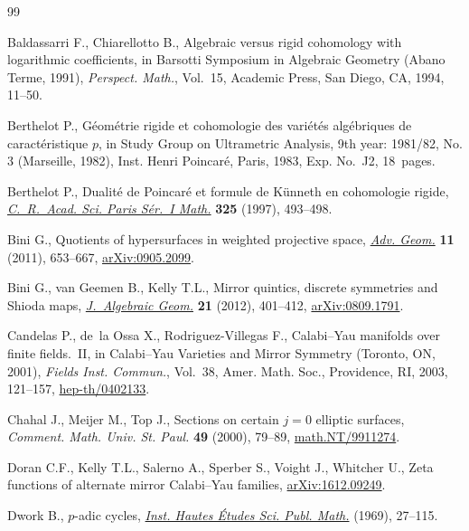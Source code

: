 \documentclass[pdftex]{sigma}
\numberwithin{equation}{section}
\begin{document}
\begin{thebibliography}{99}
\footnotesize\itemsep=0pt

Baldassarri F., Chiarellotto B., Algebraic versus rigid cohomology with
 logarithmic coef\/f\/icients, in Barsotti {S}ymposium in {A}lgebraic {G}eometry
 ({A}bano {T}erme, 1991), \textit{Perspect. Math.}, Vol.~15, Academic Press,
 San Diego, CA, 1994, 11--50.

Berthelot P., G\'eom\'etrie rigide et cohomologie des vari\'et\'es
 alg\'ebriques de caract\'eristique {$p$}, in Study Group on Ultrametric
 Analysis, 9th year: 1981/82, {N}o. 3 ({M}arseille, 1982), Inst. Henri
 Poincar\'e, Paris, 1983, Exp. No.~J2, 18~pages.

Berthelot P., Dualit\'e de {P}oincar\'e et formule de {K}\"unneth en
 cohomologie rigide, \href{https://doi.org/10.1016/S0764-4442(97)88895-7}{\textit{C.~R.~Acad. Sci. Paris S\'er.~I Math.}}
 \textbf{325} (1997), 493--498.

Bini G., Quotients of hypersurfaces in weighted projective space, \href{https://doi.org/10.1515/ADVGEOM.2011.029}{\textit{Adv.
 Geom.}} \textbf{11} (2011), 653--667, \href{https://arxiv.org/abs/0905.2099}{arXiv:0905.2099}.

Bini G., van Geemen B., Kelly T.L., Mirror quintics, discrete symmetries and
 {S}hioda maps, \href{https://doi.org/10.1090/S1056-3911-2011-00544-4}{\textit{J.~Algebraic Geom.}} \textbf{21} (2012), 401--412,
 \href{https://arxiv.org/abs/0809.1791}{arXiv:0809.1791}.

Candelas P., de~la Ossa X., Rodriguez-Villegas F., Calabi--{Y}au manifolds over
 f\/inite f\/ields.~{II}, in Calabi--{Y}au Varieties and Mirror Symmetry
 ({T}oronto, {ON}, 2001), \textit{Fields Inst. Commun.}, Vol.~38, Amer. Math.
 Soc., Providence, RI, 2003, 121--157, \href{https://arxiv.org/abs/hep-th/0402133}{hep-th/0402133}.

Chahal J., Meijer M., Top J., Sections on certain {$j=0$} elliptic surfaces,
 \textit{Comment. Math. Univ. St. Paul.} \textbf{49} (2000), 79--89,
 \href{https://arxiv.org/abs/math.NT/9911274}{math.NT/9911274}.

Doran C.F., Kelly T.L., Salerno A., Sperber S., Voight J., Whitcher U., Zeta
 functions of alternate mirror {C}alabi--{Y}au families, \href{https://arxiv.org/abs/1612.09249}{arXiv:1612.09249}.

Dwork B., {$p$}-adic cycles, \href{https://doi.org/10.1007/BF02684886}{\textit{Inst. Hautes \'Etudes Sci. Publ. Math.}}
 (1969), 27--115.


\end{thebibliography}
\end{document}
